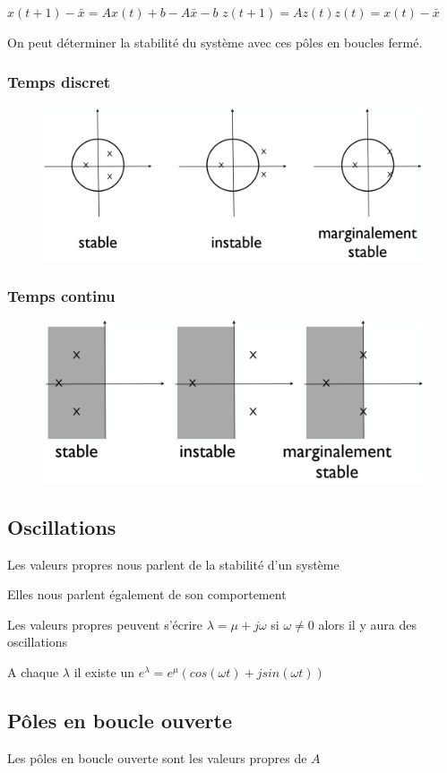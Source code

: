 \documentclass[resume]{subfiles}
\begin{document}
$x(t + 1)-\bar{x} = Ax(t) + b - A\bar{x}-b$
$z(t + 1) = Az(t) z(t) = x(t) - \bar{x}$ 

On peut déterminer la stabilité du système avec ces pôles en boucles fermé.

\subsubsection{Temps discret}

\begin{figure}[H]
    \centering
    \includegraphics[width=0.8\columnwidth]{Figures/Stabilite_1.png}
\end{figure}

\subsubsection{Temps continu}

\begin{figure}[H]
    \centering
    \includegraphics[width=0.8\columnwidth]{Figures/Stabilite_2.png}
\end{figure}

\subsection{Oscillations}

Les valeurs propres nous parlent de la stabilité d'un système  

Elles nous parlent également de son comportement  

Les valeurs propres peuvent s'écrire $\lambda=\mu+j\omega$ si $\omega \neq 0$ alors il y aura des oscillations

A chaque $\lambda$ il existe un $e^{\lambda}=e^{\mu}(cos(\omega t)+jsin(\omega t))$

\subsection{Pôles en boucle ouverte}
Les pôles en boucle ouverte sont les valeurs propres de $A$
\end{document}
